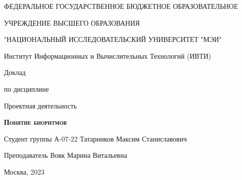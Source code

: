 \begin{titlepage}

\thispagestyle{empty}

\centerline{ФЕДЕРАЛЬНОЕ ГОСУДАРСТВЕННОЕ БЮДЖЕТНОЕ ОБРАЗОВАТЕЛЬНОЕ}
\centerline{УЧРЕЖДЕНИЕ ВЫСШЕГО ОБРАЗОВАНИЯ}
\centerline{"НАЦИОНАЛЬНЫЙ ИССЛЕДОВАТЕЛЬСКИЙ УНИВЕРСИТЕТ "МЭИ"}

\vfill

\begin{center}
\Large Институт Информационных и Вычислительных Технологий (ИВТИ) \\ 
\end{center}

\vfill

\centerline{\huge{Доклад}}
\centerline{\large{по дисциплине}}
\centerline{\LARGE{Проектная деятельность}}

\vfill

\begin{center}
\textsc{\textbf{Понятие биоритмов }}
\end{center}

\vfill

Студент группы А-07-22 \hfill Татарников Максим Станиславович

Преподаватель \hfill Вовк Марина Витальевна

\vfill

\centerline{Москва, 2023}
\clearpage
\end{titlepage}
